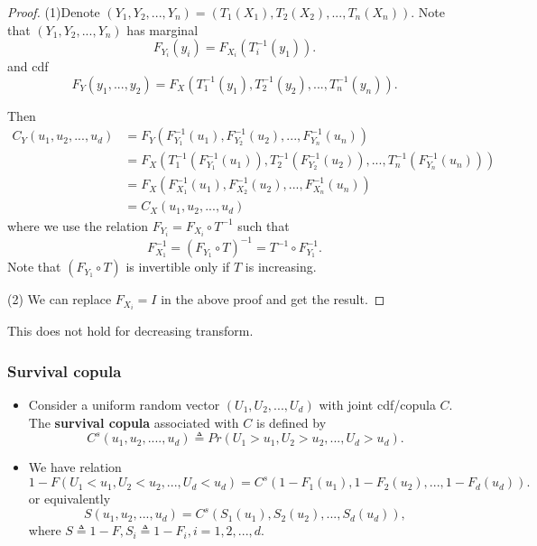 \begin{refsection}
\begin{lemma}
	
\end{lemma}
\begin{proof}
(1)Denote $(Y_1,Y_2,...,Y_n) = (T_1(X_1),T_2(X_2),...,T_n(X_n))$. 	
	Note that $(Y_1,Y_2,...,Y_n)$ has marginal $$F_{Y_i}(y_i)=F_{X_i}(T_i^{-1}(y_1)).$$
	and cdf
	$$F_Y(y_1,...,y_2) = F_X(T_1^{-1}(y_1),T_2^{-1}(y_2),...,T_n^{-1}(y_n)).$$
	
	Then 
	\begin{align*}
C_Y(u_1,u_2,...,u_d) &= F_Y(F^{-1}_{Y_1}(u_1),F^{-1}_{Y_2}(u_2),...,F^{-1}_{Y_n}(u_n)) \\
&= F_X(T_1^{-1}(F^{-1}_{Y_1}(u_1)),T_2^{-1}(F^{-1}_{Y_2}(u_2)),...,T_n^{-1}(F^{-1}_{Y_n}(u_n))) \\
&=F_X(F_{X_1}^{-1}(u_1),F_{X_2}^{-1}(u_2),...,F_{X_n}^{-1}(u_n))	\\
&=C_X(u_1,u_2,...,u_d)
	\end{align*}
where we use the relation $F_{Y_i} = F_{X_i}\circ T^{-1}$ such that
$$F_{X_1}^{-1} = (F_{Y_1}\circ T)^{-1} = T^{-1}\circ F_{Y_1}^{-1}.$$
Note that $(F_{Y_1}\circ T)$ is invertible only if $T$ is increasing.

(2) We can replace $F_{X_i} = I$ in the above proof and get the result.

\end{proof}

\begin{remark}[caution!]
	This does not hold for decreasing transform.
\end{remark}

\subsubsection{Survival copula}
\begin{definition}\hfill
\begin{itemize}
	\item Consider a uniform random vector $(U_1,U_2,...,U_d)$ with joint cdf/copula $C$. The \textbf{survival copula} associated with $C$ is defined by
	$$C^s(u_1,u_2,....,u_d) \triangleq Pr(U_1>u_1,U_2>u_2,...,U_d>u_d).$$
	\item We have relation
	$$1 - F(U_1 < u_1,U_2 < u_2,..., U_d < u_d) = C^s(1 - F_1(u_1),1-F_2(u_2),...,1 - F_d(u_d)).$$
	or equivalently
	$$S(u_1,u_2,..., u_d) = C^s(S_1(u_1),S_2(u_2),...,S_d(u_d)),$$
	where $S\triangleq 1 - F, S_i \triangleq 1 - F_i, i=1,2,...,d $.	
\end{itemize}	
\end{definition}



\end{refsection}
